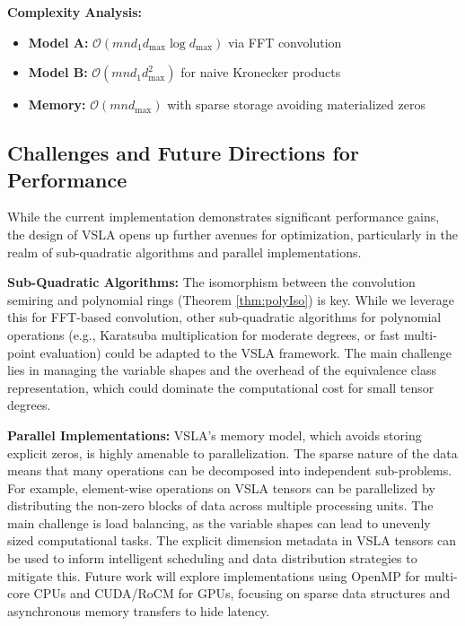\documentclass[11pt]{article}
\begin{document}
\textbf{Complexity Analysis:} 
\begin{itemize}[leftmargin=1.5em]
\item \textbf{Model A:} $\mathcal{O}(mn d_1 d_{\max} \log d_{\max})$ via FFT convolution
\item \textbf{Model B:} $\mathcal{O}(mn d_1 d_{\max}^2)$ for naive Kronecker products  
\item \textbf{Memory:} $\mathcal{O}(mn d_{\max})$ with sparse storage avoiding materialized zeros
\end{itemize}

\subsection{Challenges and Future Directions for Performance}
While the current implementation demonstrates significant performance gains, the design of VSLA opens up further avenues for optimization, particularly in the realm of sub-quadratic algorithms and parallel implementations.

\textbf{Sub-Quadratic Algorithms:} The isomorphism between the convolution semiring and polynomial rings (Theorem \ref{thm:polyIso}) is key. While we leverage this for FFT-based convolution, other sub-quadratic algorithms for polynomial operations (e.g., Karatsuba multiplication for moderate degrees, or fast multi-point evaluation) could be adapted to the VSLA framework. The main challenge lies in managing the variable shapes and the overhead of the equivalence class representation, which could dominate the computational cost for small tensor degrees.

\textbf{Parallel Implementations:} VSLA's memory model, which avoids storing explicit zeros, is highly amenable to parallelization. The sparse nature of the data means that many operations can be decomposed into independent sub-problems. For example, element-wise operations on VSLA tensors can be parallelized by distributing the non-zero blocks of data across multiple processing units. The main challenge is load balancing, as the variable shapes can lead to unevenly sized computational tasks. The explicit dimension metadata in VSLA tensors can be used to inform intelligent scheduling and data distribution strategies to mitigate this. Future work will explore implementations using OpenMP for multi-core CPUs and CUDA/RoCM for GPUs, focusing on sparse data structures and asynchronous memory transfers to hide latency.

\end{document}

